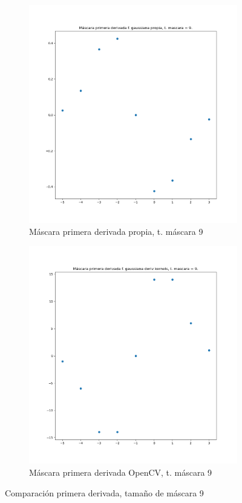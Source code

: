 \documentclass[12pt, spanish]{article}
\begin{document}
\begin{figure}[H]
  \centering
	\begin{subfigure}[t]{0.4\textwidth}
		\centering
		\includegraphics[width = \textwidth]{cmp-p9.png}
 		 \caption{Máscara primera derivada propia, t. máscara 9}
	\end{subfigure}
	\hspace{1cm}
	\begin{subfigure}[t]{0.4\textwidth}
		\centering
		\includegraphics[width = \textwidth]{cmp-cv9.png}
 		 \caption{Máscara primera derivada OpenCV, t. máscara 9}
	\end{subfigure}
	\caption{Comparación primera derivada, tamaño de máscara 9}
  	\label{fig:ej1c5}
\end{figure}
\end{document}
